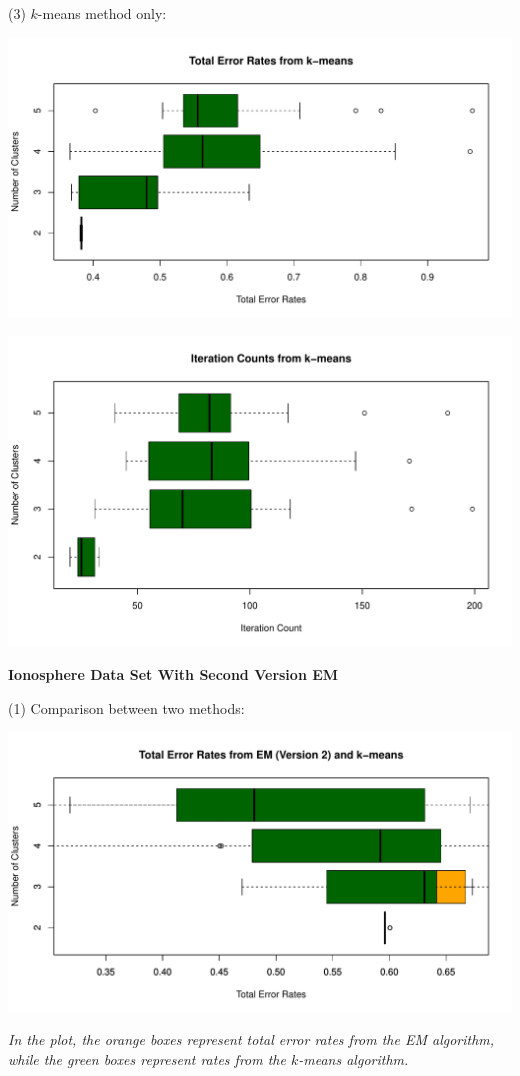 \documentclass[a4paper,12pt]{article}
\begin{document}
\noindent (3) $k$-means method only:
\begin{center}
  \includegraphics[width=0.8\linewidth]{Image/Prob3-TotalErr-Ringnorm-kmeans.pdf}
\end{center}
\begin{center}
  \includegraphics[width=0.8\linewidth]{Image/Prob3-ItrCount-Ringnorm-kmeans.pdf}
\end{center}










\bigskip
\begin{center}
    \textcolor{mydarkgreen}{\textbf{Ionosphere Data Set With Second Version EM}}
\end{center}

\noindent (1) Comparison between two methods:

\begin{center}
  \includegraphics[width=0.9\linewidth]{Image/Prob3-2-TotalErr-Ionosphere-Both.pdf}
  
   \parbox{0.9\textwidth}{\textit{In the plot, the \textcolor{myorange}{orange boxes} represent total error rates from the EM algorithm, while the \textcolor{mydarkgreen}{green boxes} represent rates from the $k$-means algorithm.
  }}
\end{center}
\bigskip
\end{document}
